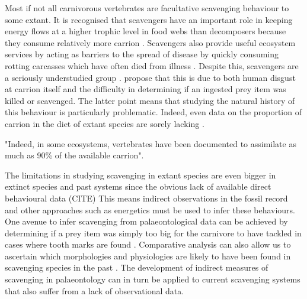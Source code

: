 \documentclass[a4paper,12pt]{article}
\begin{document}
Most if not all carnivorous vertebrates are facultative scavenging behaviour to some extant.
It is recognised that scavengers have an important role in keeping energy flows at a higher trophic level in food webs than decomposers because they consume relatively more carrion \citep{devault2003scavenging}. 
Scavengers also provide useful ecosystem services by acting as barriers to the spread of disease by quickly consuming rotting carcasses which have often died from illness \citep{ogada2012dropping}.
Despite this, scavengers are a seriously understudied group \citep{sekercioglu2006increasing,selva2007nested,wilson2011scavenging}.  
\cite{devault2003scavenging} propose that this is due to both human disgust at carrion itself and the difficulty in determining if an ingested prey item was killed or scavenged. 
The latter point means that studying the natural history of this behaviour is particularly problematic.
Indeed, even data on the proportion of carrion in the diet of extant species are sorely lacking \citep{benbow2015introduction}.

"Indeed, in some ecosystems, vertebrates have been documented to assimilate as much as 90\% of the available carrion"\citep{benbow2015introduction}.


The limitations in studying scavenging in extant species are even bigger in extinct species and past systems since the obvious lack of available direct behavioural data (CITE) %
This means indirect observations in the fossil record and other approaches such as energetics must be used to infer these behaviours. %
One avenue to infer scavenging from palaeontological data can be achieved by determining if a prey item was simply too big for the carnivore to have tackled in cases where tooth marks are found \citep{pobiner2008paleoecological}. 
Comparative analysis can also allow us to ascertain which morphologies and physiologies are likely to have been found in scavenging species in the past \citep{ruxton2004obligate}.
The development of indirect measures of scavenging in palaeontology can in turn be applied to current scavenging systems that also suffer from a lack of observational data.
\end{document}

